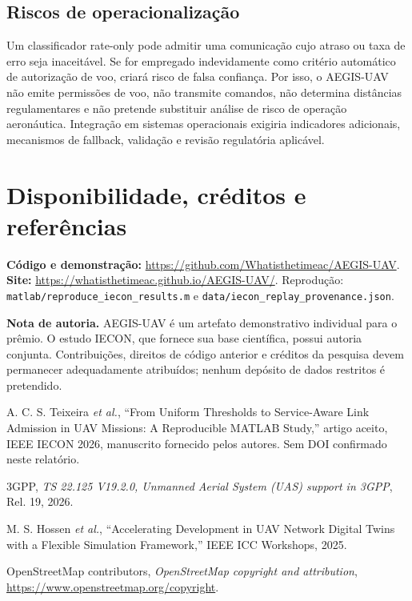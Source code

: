 \documentclass[10pt,a4paper,twocolumn]{article}
\begin{document}
\subsection{Riscos de operacionalização}
Um classificador rate-only pode admitir uma comunicação cujo atraso ou taxa de erro seja inaceitável. Se for empregado indevidamente como critério automático de autorização de voo, criará risco de falsa confiança. Por isso, o AEGIS-UAV não emite permissões de voo, não transmite comandos, não determina distâncias regulamentares e não pretende substituir análise de risco de operação aeronáutica. Integração em sistemas operacionais exigiria indicadores adicionais, mecanismos de fallback, validação e revisão regulatória aplicável.

\section*{Disponibilidade, créditos e referências}
\textbf{Código e demonstração:} \url{https://github.com/Whatisthetimeac/AEGIS-UAV}. \textbf{Site:} \url{https://whatisthetimeac.github.io/AEGIS-UAV/}. Reprodução: \texttt{matlab/reproduce\_iecon\_results.m} e \texttt{data/iecon\_replay\_provenance.json}.

\textbf{Nota de autoria.} AEGIS-UAV é um artefato demonstrativo individual para o prêmio. O estudo IECON, que fornece sua base científica, possui autoria conjunta. Contribuições, direitos de código anterior e créditos da pesquisa devem permanecer adequadamente atribuídos; nenhum depósito de dados restritos é pretendido.

\begin{enumerate}[leftmargin=*,label={[\arabic*]},itemsep=2pt]
\item A. C. S. Teixeira \textit{et al.}, ``From Uniform Thresholds to Service-Aware Link Admission in UAV Missions: A Reproducible MATLAB Study,'' artigo aceito, IEEE IECON 2026, manuscrito fornecido pelos autores. Sem DOI confirmado neste relatório.
\item 3GPP, \textit{TS 22.125 V19.2.0, Unmanned Aerial System (UAS) support in 3GPP}, Rel. 19, 2026.
\item M. S. Hossen \textit{et al.}, ``Accelerating Development in UAV Network Digital Twins with a Flexible Simulation Framework,'' IEEE ICC Workshops, 2025.
\item OpenStreetMap contributors, \textit{OpenStreetMap copyright and attribution}, \url{https://www.openstreetmap.org/copyright}.\end{enumerate}
\end{document}
